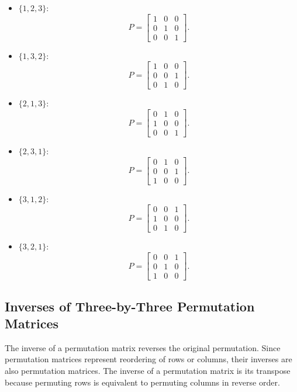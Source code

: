\documentclass{article}
\begin{document}
\begin{itemize}
    \item $\{1, 2, 3\}$:
    \[
    P = \begin{bmatrix}
    1 & 0 & 0 \\
    0 & 1 & 0 \\
    0 & 0 & 1
    \end{bmatrix}.
    \]

    \item $\{1, 3, 2\}$:
    \[
    P = \begin{bmatrix}
    1 & 0 & 0 \\
    0 & 0 & 1 \\
    0 & 1 & 0
    \end{bmatrix}.
    \]

    \item $\{2, 1, 3\}$:
    \[
    P = \begin{bmatrix}
    0 & 1 & 0 \\
    1 & 0 & 0 \\
    0 & 0 & 1
    \end{bmatrix}.
    \]

    \item $\{2, 3, 1\}$:
    \[
    P = \begin{bmatrix}
    0 & 1 & 0 \\
    0 & 0 & 1 \\
    1 & 0 & 0
    \end{bmatrix}.
    \]

    \item $\{3, 1, 2\}$:
    \[
    P = \begin{bmatrix}
    0 & 0 & 1 \\
    1 & 0 & 0 \\
    0 & 1 & 0
    \end{bmatrix}.
    \]

    \item $\{3, 2, 1\}$:
    \[
    P = \begin{bmatrix}
    0 & 0 & 1 \\
    0 & 1 & 0 \\
    1 & 0 & 0
    \end{bmatrix}.
    \]
\end{itemize}

\subsection*{Inverses of Three-by-Three Permutation Matrices}
The inverse of a permutation matrix reverses the original permutation. Since permutation matrices represent reordering of rows or columns, their inverses are also permutation matrices. The inverse of a permutation matrix is its transpose because permuting rows is equivalent to permuting columns in reverse order.
\end{document}
